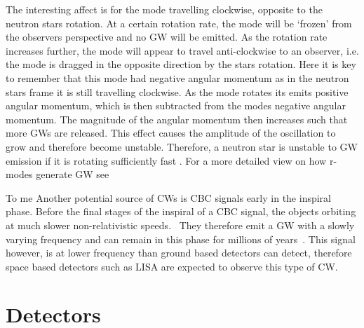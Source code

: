 The interesting affect is for the mode travelling clockwise, opposite to the neutron stars rotation. 
At a certain rotation rate, the mode will be `frozen' from the observers perspective and no \gls{GW} will be emitted.
As the rotation rate increases further, the mode will appear to travel anti-clockwise to an observer, i.e. the mode is dragged in the opposite direction by the stars rotation. 
Here it is key to remember that this mode had negative angular momentum as in the neutron stars frame it is still travelling clockwise.
As the mode rotates its emits positive angular momentum, which is then subtracted from the modes negative angular momentum.
The magnitude of the angular momentum then increases such that more \glspl{GW} are released.
This effect causes the amplitude of the oscillation to grow and therefore become unstable.
Therefore, a neutron star is unstable to \gls{GW} emission if it is rotating sufficiently fast \citep{lasky2015GravitationalWaves}.
For a more detailed view on how r-modes generate \gls{GW} see \citep{owen1998GravitationalWaves,jonesCFSInstability}
\fi

%
%
\if
To me 
Another potential source of \glspl{CW} is \gls{CBC} signals
early in the inspiral phase.  Before the final stages of the inspiral of a
\gls{CBC} signal, the objects orbiting at much slower non-relativistic
speeds.~ They therefore emit a
\gls{GW} with a slowly varying frequency and can remain in this phase for
millions of years~.  This signal however, is at lower frequency than
ground based detectors can detect, therefore space based detectors such as
\gls{LISA} \citep{danzmann1996LISALaser} are expected to observe this type of
\gls{CW}.~
\fi


\section{\label{intro:detector}Detectors}


